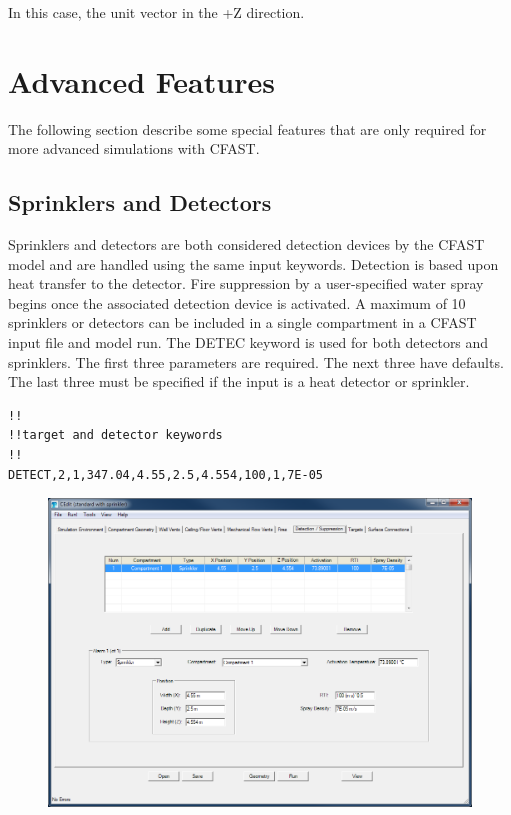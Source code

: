 In this case, the unit vector in the +Z direction.

\newpage
\section{Advanced Features}

The following section describe some special features that are only required for more advanced simulations with CFAST.

\subsection{Sprinklers and Detectors}

Sprinklers and detectors are both considered detection devices by the CFAST model and are handled using the same input keywords.  Detection is based upon heat transfer to the detector. Fire suppression by a user-specified water spray begins once the associated detection device is activated.  A maximum of 10 sprinklers or detectors can be included in a single compartment in a CFAST input file and model run. The DETEC keyword is used for both detectors and sprinklers. The first three parameters are required. The next three have defaults. The last three must be specified if the input is a heat detector or sprinkler.

\begin{lstlisting}
!!
!!target and detector keywords
!!
DETECT,2,1,347.04,4.55,2.5,4.554,100,1,7E-05
\end{lstlisting}

\begin{figure}[h!]
\begin{center}
\includegraphics[width=6.5in]{FIGURES/Input_File/Detector_Tab}
\end{center}
\end{figure}

